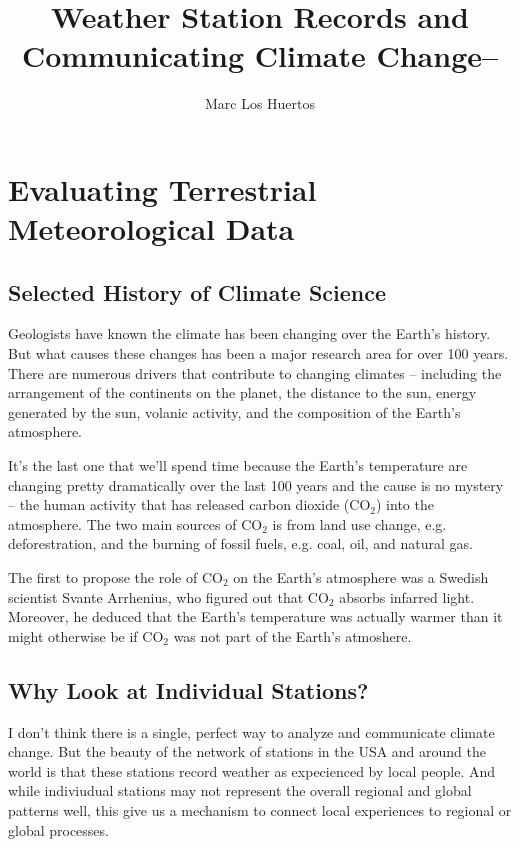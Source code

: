 \documentclass{article}
\title{Weather Station Records and Communicating Climate Change--}
\author{Marc Los Huertos}
\begin{document}
\maketitle

\tableofcontents

\section{Evaluating Terrestrial Meteorological Data}

\subsection{Selected History of Climate Science}

Geologists have known the climate has been changing over the Earth's history. But what causes these changes has been a major research area for over 100 years. There are numerous drivers that contribute to changing climates -- including the arrangement of the continents on the planet, the distance to the sun, energy generated by the sun, volanic activity, and the composition of the Earth's atmosphere. 

It's the last one that we'll spend time because the Earth's temperature are changing pretty dramatically over the last 100 years and the cause is no mystery -- the human activity that has released carbon dioxide (CO$_2$) into the atmosphere. The two main sources of CO$_2$ is from land use change, e.g. deforestration, and the burning of fossil fuels, e.g. coal, oil, and natural gas. 

The first to propose the role of CO$_2$ on the Earth's atmosphere was a Swedish scientist Svante Arrhenius, who figured out that CO$_2$ absorbs infarred light. Moreover, he deduced that the Earth's temperature was actually warmer than it might otherwise be if CO$_2$ was not part of the Earth's atmoshere. 

\subsection{Why Look at Individual Stations?}

I don't think there is a single, perfect way to analyze and communicate climate change. But the beauty of the network of stations in the USA and around the world is that these stations record weather as expecienced by local people. And while indiviudual stations may not represent the overall regional and global patterns well, this give us a mechanism to connect local experiences to regional or global processes. 
\end{document}
